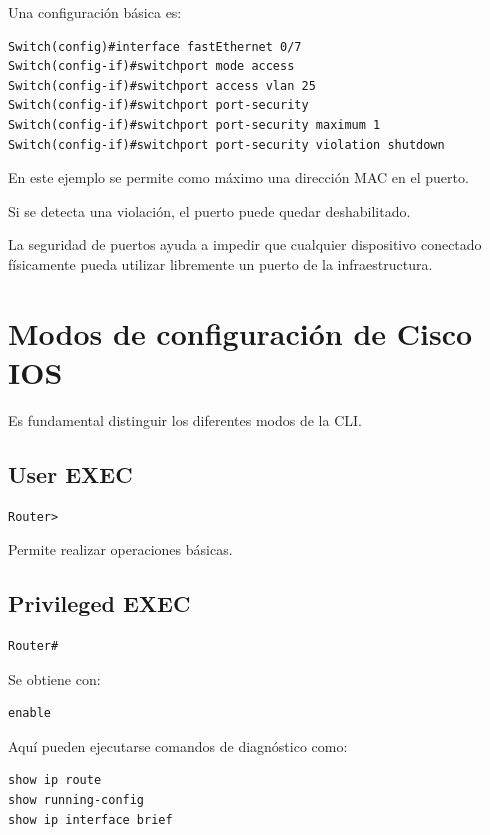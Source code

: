 \documentclass[12pt]{article}
\begin{document}
Una configuración básica es:

\begin{lstlisting}
Switch(config)#interface fastEthernet 0/7
Switch(config-if)#switchport mode access
Switch(config-if)#switchport access vlan 25
Switch(config-if)#switchport port-security
Switch(config-if)#switchport port-security maximum 1
Switch(config-if)#switchport port-security violation shutdown
\end{lstlisting}

En este ejemplo se permite como máximo una dirección MAC en el puerto.

Si se detecta una violación, el puerto puede quedar deshabilitado.

La seguridad de puertos ayuda a impedir que cualquier dispositivo conectado
físicamente pueda utilizar libremente un puerto de la infraestructura.


\section{Modos de configuración de Cisco IOS}

Es fundamental distinguir los diferentes modos de la CLI.

\subsection{User EXEC}

\begin{lstlisting}
Router>
\end{lstlisting}

Permite realizar operaciones básicas.


\subsection{Privileged EXEC}

\begin{lstlisting}
Router#
\end{lstlisting}

Se obtiene con:

\begin{lstlisting}
enable
\end{lstlisting}

Aquí pueden ejecutarse comandos de diagnóstico como:

\begin{lstlisting}
show ip route
show running-config
show ip interface brief
\end{lstlisting}
\end{document}
